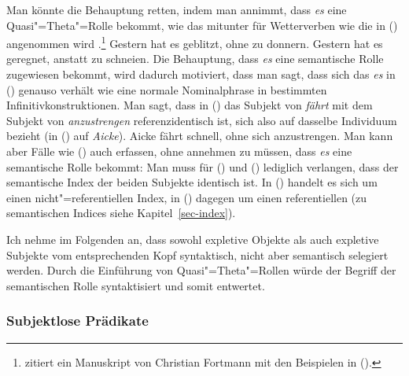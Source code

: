 \noindent
Man könnte die Behauptung retten, indem man annimmt, dass \emph{es} eine
Quasi"=Theta"=Rolle bekommt, wie das mitunter für
Wetterverben wie die in () angenommen wird
  \citep[--327]{Chomsky93a}\nocite{Chomsky81a}.\footnote{ 
  \citet{Berman99a} zitiert ein Manuskript von Christian Fortmann 
  mit den Beispielen in ().%
}
\eal
\ex Gestern hat es geblitzt, ohne zu donnern.
\ex Gestern hat es geregnet, anstatt zu schneien.
\zl
Die Behauptung, dass \emph{es} eine semantische Rolle zugewiesen bekommt, wird dadurch
motiviert, dass man sagt, dass sich das \emph{es} in () genauso verhält wie eine
normale Nominalphrase in bestimmten Infinitivkonstruktionen.
Man sagt, dass in () das Subjekt von \emph{fährt} mit dem Subjekt von \emph{anzustrengen}
referenzidentisch ist, sich also auf dasselbe Individuum bezieht (in () auf \emph{Aicke}).
\ea
Aicke fährt schnell, ohne sich anzustrengen.
\z
Man kann aber Fälle wie () auch erfassen, ohne annehmen
zu müssen, dass \emph{es} eine semantische Rolle bekommt: Man muss für () und ()
lediglich verlangen, dass der semantische Index der beiden
Subjekte identisch ist. In () handelt es sich um einen
nicht"=referentiellen Index, in () dagegen um einen referentiellen 
(zu semantischen Indices siehe Kapitel~\ref{sec-index}).

Ich nehme im Folgenden an, dass sowohl expletive Objekte als auch expletive Subjekte
vom entsprechenden Kopf syntaktisch, nicht aber semantisch selegiert werden.
Durch die Einführung von Quasi"=Theta"=Rollen würde der Begriff der semantischen Rolle 
syntaktisiert\label{page-syntaktisierung} und somit entwertet.

\subsubsection{Subjektlose Prädikate}
\label{sec-subjekt-valenz}

